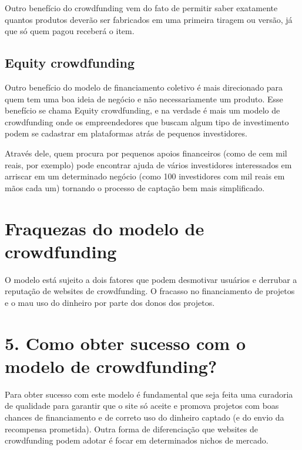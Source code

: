 \documentclass{classe_cn}                 %
\begin{document}
Outro benefício do crowdfunding vem do fato de permitir saber exatamente quantos produtos deverão ser fabricados em uma primeira tiragem ou versão, já que só quem pagou receberá o item.

\subsection{Equity crowdfunding}

Outro benefício do modelo de financiamento coletivo é mais direcionado para quem tem uma boa ideia de negócio e não necessariamente um produto. Esse benefício se chama Equity crowdfunding, e na verdade é mais um modelo de crowdfunding onde os empreendedores que buscam algum tipo de investimento podem se cadastrar em plataformas atrás de pequenos investidores.

Através dele, quem procura por pequenos apoios financeiros (como de cem mil reais, por exemplo) pode encontrar ajuda de vários investidores interessados em arriscar em um determinado negócio (como 100 investidores com mil reais em mãos cada um) tornando o processo de captação bem mais simplificado.

\section{Fraquezas do modelo de crowdfunding}

O modelo está sujeito a dois fatores que podem desmotivar usuários e derrubar a reputação de websites de crowdfunding. O fracasso no financiamento de projetos e o mau uso do dinheiro por parte dos donos dos projetos.


\section{5. Como obter sucesso com o modelo de crowdfunding?}

Para obter sucesso com este modelo é fundamental que seja feita uma curadoria de qualidade para garantir que o site só aceite e promova projetos com boas chances de financiamento e de correto uso do dinheiro captado (e do envio da recompensa prometida). Outra forma de diferenciação que websites de crowdfunding podem adotar é focar em determinados nichos de mercado.
\end{document}
